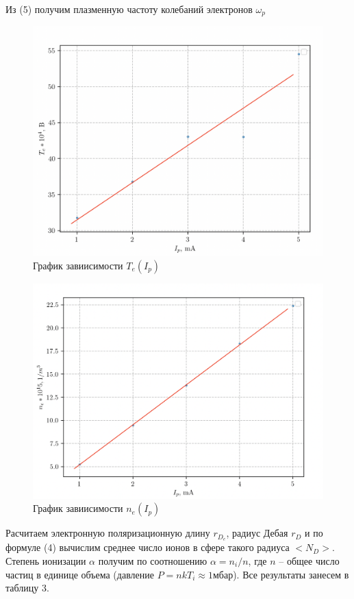 \documentclass[12pt,a4paper]{article}
\begin{document}
Из (5) получим плазменную частоту колебаний электронов $\omega_p$

\begin{figure}[H]
    \centering
    \includegraphics[width=0.5\linewidth]{Te(Ip).png}
    \caption{График завиисимости $T_e(I_p)$}
\end{figure}

\begin{figure}[H]
    \centering
    \includegraphics[width=0.5\linewidth]{ne(Ip).png}
    \caption{График завиисимости $n_e(I_p)$}
\end{figure}

Расчитаем электронную поляризационную длину $r_{D_e}$, радиус Дебая $r_{D}$ и по формуле (4)  вычислим среднее число ионов в сфере такого радиуса $<N_D>$.
Степень ионизации $\alpha$ получим по соотношению $\alpha = n_i/n$, где $n$ -- общее число частиц в единице объема (давление $P=nkT_i\approx 1$мбар). 
Все результаты занесем в таблицу 3.
\end{document}
